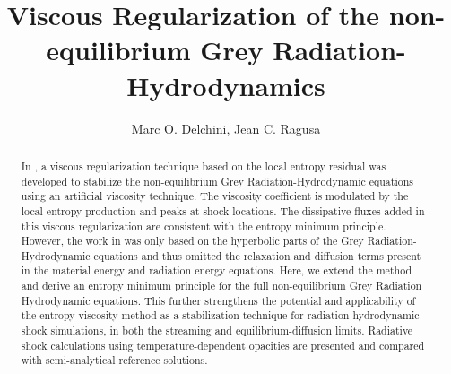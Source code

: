 \documentclass[times,doublespace]{fldauth}%
\begin{document}
%


\title{Viscous Regularization of the non-equilibrium Grey Radiation-Hydrodynamics}

\author{Marc O. Delchini, Jean C. Ragusa\corrauth{}}

\address{Department of Nuclear Engineering, Texas A\&M University, College Station, TX 77843, USA}


\begin{abstract}
In \cite{our_jcp_radhy_paper}, a viscous regularization technique based on the local entropy residual was
developed to stabilize the non-equilibrium Grey Radiation-Hydrodynamic equations using an artificial viscosity technique. 
The viscosity coefficient is modulated by the local entropy production and peaks at shock locations. 
The dissipative fluxes added in this viscous regularization are consistent with the entropy minimum principle. 
However, the work in \cite{our_jcp_radhy_paper} was only based on the hyperbolic parts
of the Grey Radiation-Hydrodynamic equations and thus omitted the relaxation and diffusion terms 
present in the material energy and radiation energy equations. 
%
Here, we extend the method and derive an entropy minimum principle for the full non-equilibrium Grey Radiation Hydrodynamic 
equations. This further strengthens the potential and applicability of the entropy viscosity method as a stabilization technique 
for radiation-hydrodynamic shock simulations, in both the streaming and equilibrium-diffusion limits. 
Radiative shock calculations using temperature-dependent opacities are presented and 
compared with semi-analytical reference solutions. %
\end{abstract}
\end{document}
